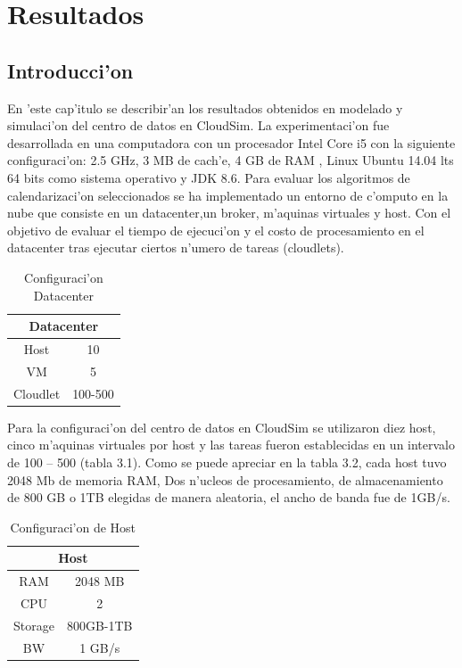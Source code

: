 \chapter{Resultados}
\section*{Introducci'on}

En 'este cap'itulo se describir'an los resultados obtenidos en modelado y simulaci'on del centro de datos en CloudSim. La experimentaci'on fue desarrollada en una computadora con  un procesador Intel Core i5  con la siguiente configuraci'on: 2.5 GHz, 3 MB de cach'e, 4 GB de RAM , Linux Ubuntu 14.04 lts 64 bits como sistema operativo y JDK 8.6.
\bigskip
Para evaluar los algoritmos de calendarizaci'on seleccionados se ha implementado un entorno de c'omputo en la nube que consiste en un datacenter,un broker, m'aquinas virtuales y host.  Con el objetivo de evaluar el tiempo de ejecuci'on y el costo de procesamiento en el datacenter tras ejecutar ciertos n'umero de tareas (cloudlets).



\begin{table}[]
	\centering
	\caption{Configuraci'on Datacenter}
	\label{my-label}
	\begin{tabular}{@{}cc@{}}
		\toprule
		\multicolumn{2}{c}{{\bf Datacenter}} \\ \midrule
		Host              & 10               \\
		VM                & 5                \\
		Cloudlet          & 100-500          \\ \bottomrule
	\end{tabular}
\end{table}



Para la configuraci'on del centro de datos en CloudSim se utilizaron diez host, cinco m'aquinas virtuales por host y las tareas fueron establecidas en un intervalo de 100 – 500 (tabla 3.1).
Como se puede apreciar en la tabla 3.2, cada host tuvo 2048 Mb de memoria RAM, Dos n'ucleos de procesamiento, de almacenamiento de 800 GB o 1TB elegidas de manera aleatoria, el ancho de banda fue de 1GB/s.

\begin{table}[]
	\centering
	\caption{Configuraci'on de Host}
	\label{my-label}
	\begin{tabular}{@{}cc@{}}
		\toprule
		\multicolumn{2}{c}{{\bf Host}} \\ \midrule
		RAM           & 2048 MB        \\
		CPU           & 2              \\
		Storage       & 800GB-1TB      \\ \midrule
		BW            & 1 GB/s        
	\end{tabular}
\end{table}

